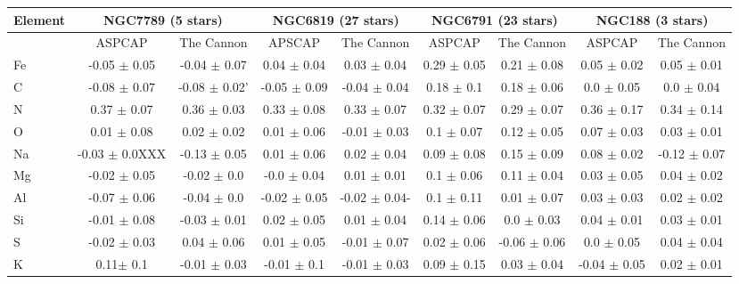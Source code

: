 \documentclass[14pt, preprint2]{aastex6}
\begin{document}
\begin{table}[!h]
\centering
\tiny
\begin{tabular}{ | p{} | c| c | c | c | c | c | c | c | }
\hline
\multicolumn{1}{|c|}{Element}& \multicolumn{2}{|c|}{NGC7789 (5 stars)} & \multicolumn{2}{|c|}{NGC6819 (27 stars)}  & \multicolumn{2}{|c|}{NGC6791 (23 stars)} & \multicolumn{2}{|c|}{ NGC188 (3 stars)} \\
\hline
 &  ASPCAP & The Cannon & APSCAP & The Cannon & ASPCAP & The Cannon & ASPCAP & The Cannon \\
 \hline
Fe &  -0.05 $\pm$ 0.05  & -0.04 $\pm$ 0.07 &  0.04 $\pm$ 0.04   & 0.03 $\pm$ 0.04  &  0.29 $\pm$ 0.05  & 0.21 $\pm$ 0.08 &   0.05 $\pm$ 0.02 & 0.05 $\pm$ 0.01   \\
C & -0.08 $\pm$ 0.07  & -0.08 $\pm$ 0.02' & -0.05 $\pm$ 0.09 & -0.04 $\pm$ 0.04 & 0.18 $\pm$ 0.1 &0.18 $\pm$ 0.06 & 0.0 $\pm$ 0.05 & 0.0 $\pm$ 0.04 \\
N &  0.37 $\pm$ 0.07 & 0.36 $\pm$ 0.03 & 0.33 $\pm$ 0.08 & 0.33 $\pm$ 0.07 & 0.32 $\pm$ 0.07 & 0.29 $\pm$ 0.07 &  0.36 $\pm$ 0.17 & 0.34 $\pm$ 0.14 \\
O & 0.01 $\pm$ 0.08 & 0.02 $\pm$ 0.02 &  0.01 $\pm$ 0.06  & -0.01 $\pm$ 0.03 & 0.1 $\pm$ 0.07 & 0.12 $\pm$ 0.05 & 0.07 $\pm$ 0.03  & 0.03 $\pm$ 0.01 \\
Na & -0.03 $\pm$ 0.0XXX & -0.13 $\pm$ 0.05 &  0.01 $\pm$ 0.06  & 0.02 $\pm$ 0.04 & 0.09 $\pm$ 0.08 & 0.15 $\pm$ 0.09 &  0.08 $\pm$ 0.02 & -0.12 $\pm$ 0.07 \\
Mg  & -0.02 $\pm$ 0.05 & -0.02 $\pm$ 0.0 &   -0.0 $\pm$ 0.04 & 0.01 $\pm$ 0.01 & 0.1 $\pm$ 0.06 & 0.11 $\pm$ 0.04 &  0.03 $\pm$ 0.05 & 0.04 $\pm$ 0.02 \\
Al  & -0.07 $\pm$ 0.06 & -0.04 $\pm$ 0.0  & -0.02 $\pm$ 0.05 & -0.02 $\pm$ 0.04- & 0.1 $\pm$ 0.11  & 0.01 $\pm$ 0.07 & 0.03 $\pm$ 0.03  & 0.02 $\pm$ 0.02 \\
Si & -0.01 $\pm$ 0.08 & -0.03 $\pm$ 0.01 &  0.02 $\pm$ 0.05 & 0.01 $\pm$ 0.04 & 0.14 $\pm$ 0.06  & 0.0 $\pm$ 0.03 & 0.04 $\pm$ 0.01  & 0.03 $\pm$ 0.01  \\
S & -0.02 $\pm$ 0.03 &  0.04 $\pm$ 0.06 &  0.01 $\pm$ 0.05 & -0.01 $\pm$ 0.07  & 0.02 $\pm$ 0.06 & -0.06 $\pm$ 0.06 & 0.0 $\pm$ 0.05   &  0.04 $\pm$ 0.04 \\
K & 0.11$\pm$ 0.1 & -0.01 $\pm$ 0.03 & -0.01 $\pm$ 0.1 & -0.01 $\pm$ 0.03 &  0.09 $\pm$ 0.15  & 0.03 $\pm$ 0.04 & -0.04 $\pm$ 0.05  & 0.02 $\pm$ 0.01  \\

\end{tabular}
\end{table}
\end{document}
